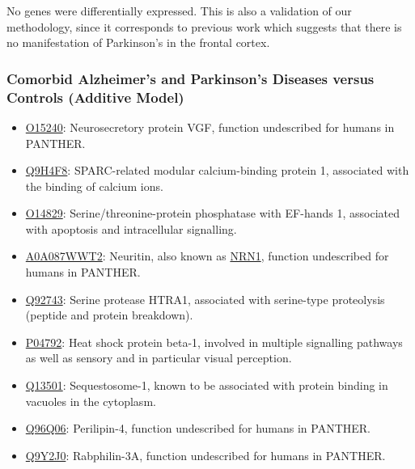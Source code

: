 No genes were differentially expressed. This is also a validation of our methodology, since it corresponds to previous work which suggests that there is no manifestation of Parkinson's in the frontal cortex.

\subsubsection{Comorbid Alzheimer's and Parkinson's Diseases versus Controls (Additive Model)}

\begin{itemize}
\item \href{http://www.pantherdb.org/genes/gene.do?acc=HUMAN\%7CHGNC\%3D12684\%7CUniProtKB\%3DO15240}{O15240}: Neurosecretory protein VGF, function undescribed for humans in PANTHER.
\item \href{http://www.pantherdb.org/genes/gene.do?acc=HUMAN\%7CHGNC\%3D20318\%7CUniProtKB\%3DQ9H4F8}{Q9H4F8}: SPARC-related modular calcium-binding protein 1, associated with the binding of calcium ions.
\item \href{http://www.pantherdb.org/genes/gene.do?acc=HUMAN\%7CHGNC\%3D9243\%7CUniProtKB\%3DO14829}{O14829}: Serine/threonine-protein phosphatase with EF-hands 1, associated with apoptosis and intracellular signalling.
\item \href{http://www.pantherdb.org/genes/gene.do?acc=HUMAN\%7CHGNC\%3D17972\%7CUniProtKB\%3DQ9NPD7}{A0A087WWT2}: Neuritin, also known as \href{https://www.uniprot.org/uniprot/A0A087WWT2}{NRN1}, function undescribed for humans in PANTHER.
\item \href{http://www.pantherdb.org/genes/gene.do?acc=HUMAN\%7CHGNC\%3D9476\%7CUniProtKB\%3DQ92743}{Q92743}: Serine protease HTRA1, associated with serine-type proteolysis (peptide and protein breakdown).
\item \href{http://www.pantherdb.org/genes/gene.do?acc=HUMAN\%7CHGNC\%3D5246\%7CUniProtKB\%3DP04792}{P04792}: Heat shock protein beta-1, involved in multiple signalling pathways as well as sensory and in particular visual perception.
\item \href{http://www.pantherdb.org/genes/gene.do?acc=HUMAN\%7CHGNC\%3D11280\%7CUniProtKB\%3DQ13501}{Q13501}: Sequestosome-1, known to be associated with protein binding in vacuoles in the cytoplasm.
\item \href{http://www.pantherdb.org/genes/gene.do?acc=HUMAN\%7CHGNC\%3D29393\%7CUniProtKB\%3DQ96Q06}{Q96Q06}: Perilipin-4, function undescribed for humans in PANTHER.
\item \href{http://www.pantherdb.org/genes/gene.do?acc=HUMAN\%7CHGNC\%3D17056\%7CUniProtKB\%3DQ9Y2J0}{Q9Y2J0}: Rabphilin-3A, function undescribed for humans in PANTHER.

\end{itemize}
